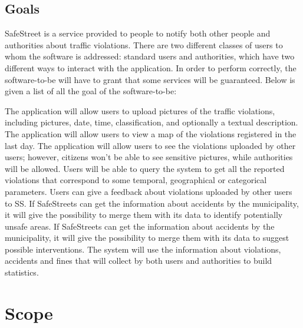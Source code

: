 \documentclass[../RASD.tex]{subfiles}
\begin{document}
    \subsection{Goals}\label{subsec:goals}
        SafeStreet is a service provided to people to notify both other people and authorities about traffic violations. There are two different classes of users to whom the software is addressed: standard users and authorities, which have two different ways to interact with the application.
        In order to perform correctly, the software-to-be will have to grant that some services will be guaranteed. Below is given a list of all the goal of the software-to-be:
        \begin{enumerate}
             The application will allow users to upload pictures of the traffic violations, including pictures, date, time, classification, and optionally a textual description.
             The application will allow users to view a map of the violations registered in the last day.
             The application will allow users to see the violations uploaded by other users; however, citizens won’t be able to see sensitive pictures, while authorities will be allowed.
             Users will be able to query the system to get all the reported violations that correspond to some temporal, geographical or categorical parameters.
             Users can give a feedback about violations uploaded by other users to SS.
             If SafeStreets can get the information about accidents by the municipality, it will give the possibility to merge them with its data to identify potentially unsafe areas.
            If SafeStreets can get the information about accidents by the municipality, it will give the possibility to merge them with its data to suggest possible interventions.
            The system will use the information about violations, accidents and fines that will collect by both users and authorities to build statistics.
        \end{enumerate}
    \newpage
    \section{Scope}\label{sec:scope}
\end{document}
